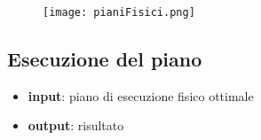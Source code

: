 \begin{figure}[htbp]
    \centering
    \texttt{[image: pianiFisici.png]}
    \label{fig:pianiFisici}
\end{figure}

\subsection{Esecuzione del piano}
\begin{itemize}
    \item \textbf{input}: piano di esecuzione fisico ottimale
    \item \textbf{output}: risultato
\end{itemize}